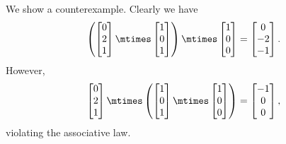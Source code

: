 \begin{solution}
    We show a counterexample.
    Clearly we have
    \begin{equation}
        \left(
        \begin{bmatrix}
            0 \\ 2\\ 1
        \end{bmatrix}\mtimes
        \begin{bmatrix}
            1 \\ 0 \\ 1
        \end{bmatrix}
        \right)
        \mtimes
        \begin{bmatrix}
            1 \\ 0 \\ 0
        \end{bmatrix}
        =
        \begin{bmatrix}
            0 \\-2\\-1
        \end{bmatrix}.
    \end{equation}
    However,
    \begin{equation}
        \begin{bmatrix}
            0 \\ 2\\ 1
        \end{bmatrix}\mtimes \left(\begin{bmatrix}
            1 \\ 0 \\ 1
        \end{bmatrix}\mtimes
        \begin{bmatrix}
            1 \\ 0 \\ 0
        \end{bmatrix}\right)
        =\begin{bmatrix}
            -1 \\0\\0
        \end{bmatrix},
    \end{equation}
    violating the associative law.
\end{solution}

